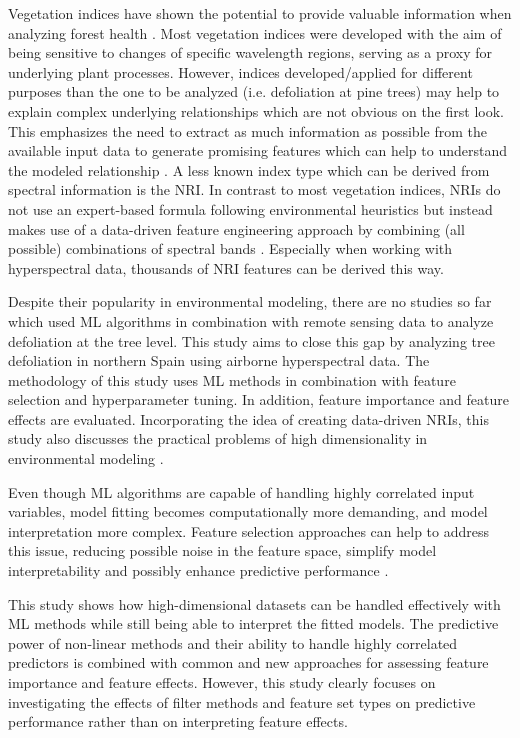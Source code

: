 \documentclass[journal]{IEEEtran}
\begin{document}
Vegetation indices have shown the potential to provide valuable information when analyzing forest health \cite{jiang2014, adamczyk2015}.
Most vegetation indices were developed with the aim of being sensitive to changes of specific wavelength regions, serving as a proxy for underlying plant processes.
However, indices developed/applied for different purposes than the one to be analyzed (i.e. defoliation at pine trees) may help to explain complex underlying relationships which are not obvious on the first look.
This emphasizes the need to extract as much information as possible from the available input data to generate promising features which can help to understand the modeled relationship \cite{thenkabail2018}.
A less known index type which can be derived from spectral information is the \ac{NRI}.
In contrast to most vegetation indices, \ac{NRI}s do not use an expert-based formula following environmental heuristics but instead makes use of a data-driven feature engineering approach by combining (all possible) combinations of spectral bands \cite{thenkabail2000}.
Especially when working with hyperspectral data, thousands of \ac{NRI} features can be derived this way.


Despite their popularity in environmental modeling, there are no studies so far which used ML algorithms in combination with remote sensing data to analyze defoliation at the tree level.
This study aims to close this gap by analyzing tree defoliation in northern Spain using airborne hyperspectral data.
The methodology of this study uses ML methods in combination with feature selection and hyperparameter tuning.
In addition, feature importance and feature effects are evaluated.
Incorporating the idea of creating data-driven \ac{NRI}s, this study also discusses the practical problems of high dimensionality in environmental modeling \cite{trunk1979, xu2016}.

Even though \ac{ML} algorithms are capable of handling highly correlated input variables, model fitting becomes computationally more demanding, and model interpretation more complex.
Feature selection approaches can help to address this issue, reducing possible noise in the feature space, simplify model interpretability and possibly enhance predictive performance \cite{cai2018}.

This study shows how high-dimensional datasets can be handled effectively with ML methods while still being able to interpret the fitted models.
The predictive power of non-linear methods and their ability to handle highly correlated predictors is combined with common and new approaches for assessing feature importance and feature effects.
However, this study clearly focuses on investigating the effects of filter methods and feature set types on predictive performance rather than on interpreting feature effects.
\end{document}

